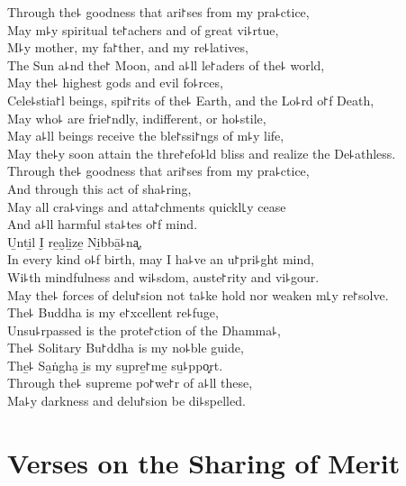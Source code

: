 \begin{leader}
\end{leader}

Through the꜕ goodness that ari꜓ses from my pra꜕ctice,\\
May m꜕y spiritual te꜓achers and  of great vi꜕rtue,\\
M꜕y mother, my fa꜓ther, and my re꜕latives,\\
The Sun a꜕nd the꜓ Moon, and a꜕ll  le꜓aders of the꜕ world,\\
May the꜕ highest gods and evil fo꜕rces,\\
Cele꜕stia꜓l beings,  spi꜓rits of the꜕ Earth, and the Lo꜕rd o꜓f Death,\\
May  who꜕ are frie꜓ndly, indifferent, or ho꜕stile,\\
May a꜕ll beings receive the ble꜓ssi꜓ngs of m꜕y life,\\
May the꜕y soon attain the thre꜓efo꜕ld bliss and realize the De꜕athless.\\
Through the꜕ goodness that ari꜓ses from my pra꜕ctice,\\
And through this act of sha꜕ring,\\
May all cra꜕vings and atta꜓chments quickl꜖y cease\\
And a꜕ll harmful sta꜕tes o꜓f mind.\\
U̱nti̱l I̮ re̱a̮li̱ze̱ Ni̱bbā̱꜕na͓,\\
In every kind o꜕f birth, may I ha꜕ve an u꜓pri꜕ght mind,\\
Wi꜕th mindfulness and wi꜕sdom, auste꜓rity and vi꜕gour.\\
May the꜕ forces of delu꜓sion not ta꜕ke hold nor weaken m꜖y re꜓solve.\\
The꜕ Buddha is my e꜓xcellent re꜕fuge,\\
Unsu꜕rpassed is the prote꜓ction of the Dhamma꜕,\\
The꜕ Solitary Bu꜓ddha is my no꜕ble guide,\\
The̱꜕ Sa̱ṅgha̮ i̱s my su̱pre̱꜓me̱ su̱꜕ppo͓rt.\\
Through the꜕ supreme po꜓we꜓r of a꜕ll these,\\
Ma꜕y darkness and delu꜓sion be di꜕spelled.

\chapter[Sharing of Merit]{Verses on the Sharing of Merit}

